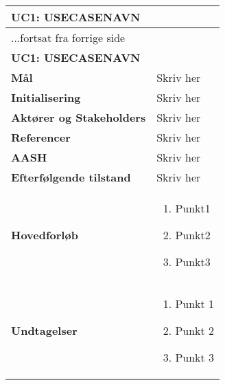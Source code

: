 \begin{center} \centering \label{UC1}
	\begin{longtable}{|p{5cm}|p{9cm}|}  %
	\hline
		\multicolumn{2}{|l|}{\textbf{UC1: USECASENAVN}} \\\hline %
		\endfirsthead
		
		\multicolumn{2}{l}{...fortsat fra forrige side} \\ \hline %
		\multicolumn{2}{|l|}{\textbf{UC1: USECASENAVN}} \\\hline %
		\endhead	
		
		\textbf{Mål}							&Skriv her		\\\hline
		\textbf{Initialisering}				&Skriv her		\\\hline
		\textbf{Aktører og Stakeholders}		&Skriv her		\\\hline 
		\textbf{Referencer}					&Skriv her		\\\hline
		\textbf{AASH}						&Skriv her		\\\hline
		\textbf{Efterfølgende tilstand}		&Skriv her		\\\hline
		\textbf{Hovedforløb}					
			&\begin{enumerate}
	
				\item Punkt1
				
				\item Punkt2				
				
				\item Punkt3
				
			\end{enumerate}
		\\\hline
		\textbf{Undtagelser}
			&\begin{enumerate}
			
				\item Punkt 1

				\item Punkt 2
				
				\item Punkt 3

			\end{enumerate}
		\\\hline
	\end{longtable} 
\end{center}


